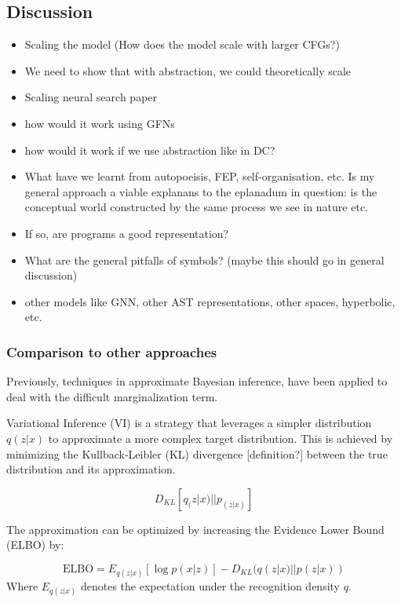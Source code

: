 \subsection{Discussion}
\begin{itemize}
    \item Scaling the model (How does the model scale with larger CFGs?)
    \item We need to show that with abstraction, we could theoretically scale
    \item Scaling neural search paper
    \item how would it work using GFNs
    \item how would it work if we use abstraction like in DC? 
    \item What have we learnt from autopoeisis, FEP, self-organisation, etc. Is my general approach a viable explanans to the eplanadum in question: is the conceptual world constructed by the same process we see in nature etc.
    \item If so, are programs a good representation?
    \item What are the general pitfalls of symbols?  (maybe this should go in general discussion)
    \item other models like GNN, other AST representations, other spaces, hyperbolic, etc. 
\end{itemize}



\subsubsection{Comparison to other approaches}

Previously, techniques in approximate Bayesian inference, have been applied to deal with the difficult marginalization term.

Variational Inference (VI) is a strategy that leverages a simpler distribution \( q(z | x) \)  to approximate a more complex target distribution. This is achieved by minimizing the Kullback-Leibler (KL) divergence [definition?] between the true distribution and its approximation.

\[
    D_{KL}[q_(z|x) || p_(z|x)]
\]

The approximation can be optimized by increasing the Evidence Lower Bound (ELBO) by:

\begin{equation}
\text{ELBO} = E_{q(z|x)}[\log p(x|z)] - D_{KL}(q(z|x) || p(z|x))
\end{equation}
Where \( E_{q(z|x)} \) denotes the expectation under the recognition density \( q \).

